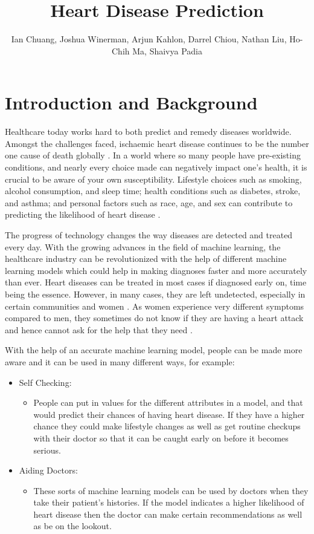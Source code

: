 \documentclass[a4paper]{article}
\title {Heart Disease Prediction}
\author{Ian Chuang, Joshua Winerman, Arjun Kahlon, Darrel Chiou, Nathan Liu, Ho-Chih Ma, Shaivya Padia}
\affil{UC Davis ECS 171 Group Project}
\date{}
\begin{document}
\maketitle
\vspace{6pt}


\section{Introduction and Background}

Healthcare today works hard to both predict and remedy diseases worldwide. Amongst the challenges faced, ischaemic heart disease continues to be the number one cause of death globally \cite{death}. In a world where so many people have pre-existing conditions, and nearly every choice made can negatively impact one’s health, it is crucial to be aware of your own susceptibility. Lifestyle choices such as smoking, alcohol consumption, and sleep time; health conditions such as diabetes, stroke, and asthma; and personal factors such as race, age, and sex can contribute to predicting the likelihood of heart disease \cite{mayoclinic}.

The progress of technology changes the way diseases are detected and treated every day. With the growing advances in the field of machine learning, the healthcare industry can be revolutionized with the help of different machine learning models which could help in making diagnoses faster and more accurately than ever. Heart diseases can be treated in most cases if diagnosed early on, time being the essence. However, in many cases, they are left undetected, especially in certain communities and women \cite{minorities}. As women experience very different symptoms compared to men, they sometimes do not know if they are having a heart attack and hence cannot ask for the help that they need \cite{women}.  

With the help of an accurate machine learning model, people can be made more aware and it can be used in many different ways, for example: 


\begin{itemize}
   \item Self Checking:
   \begin{itemize}
     \item People can put in values for the different attributes in a model, and that would predict their chances of having heart disease. If they have a higher chance they could make lifestyle changes as well as get routine checkups with their doctor so that it can be caught early on before it becomes serious.
   \end{itemize}
   \item Aiding Doctors:
   \begin{itemize}
     \item These sorts of machine learning models can be used by doctors when they take their patient’s histories. If the model indicates a higher likelihood of heart disease then the doctor can make certain recommendations as well as be on the lookout. 
   \end{itemize}
 \end{itemize}
\end{document}
